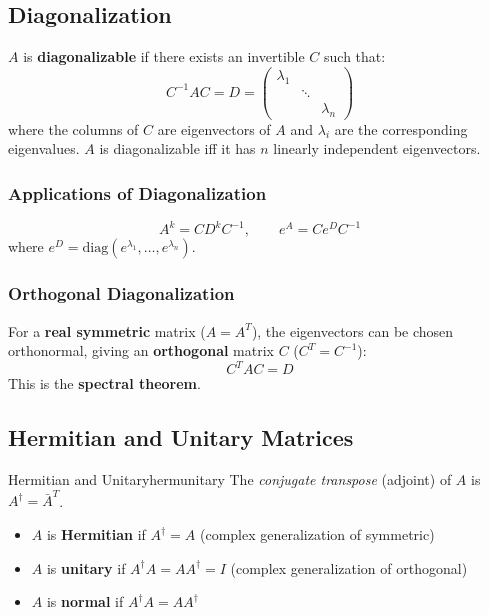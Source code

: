 \documentclass[11pt, letterpaper]{article}
\theoremstyle{plain}
\begin{document}
\subsection{Diagonalization}

$A$ is \textbf{diagonalizable} if there exists an invertible $C$ such that:
\[
    C^{-1}AC = D = \begin{pmatrix}\lambda_1 & & \\ & \ddots & \\ & & \lambda_n\end{pmatrix}
\]
where the columns of $C$ are eigenvectors of $A$ and $\lambda_i$ are the
corresponding eigenvalues. $A$ is diagonalizable iff it has $n$ linearly
independent eigenvectors.

\subsubsection*{Applications of Diagonalization}
\[
    A^k = CD^kC^{-1}, \qquad
    e^A = Ce^DC^{-1}
\]
where $e^D = \text{diag}(e^{\lambda_1},\ldots,e^{\lambda_n})$.

\subsubsection*{Orthogonal Diagonalization}
For a \textbf{real symmetric} matrix ($A = A^T$), the eigenvectors can be
chosen orthonormal, giving an \textbf{orthogonal} matrix $C$ ($C^T = C^{-1}$):
\[
    C^TAC = D
\]
This is the \textbf{spectral theorem}.


\subsection{Hermitian and Unitary Matrices}

\begin{definition}{Hermitian and Unitary}{hermunitary}
    The \emph{conjugate transpose} (adjoint) of $A$ is $A^\dagger = \bar{A}^T$.
    \begin{itemize}
        \item $A$ is \textbf{Hermitian} if $A^\dagger = A$
              (complex generalization of symmetric)
        \item $A$ is \textbf{unitary} if $A^\dagger A = AA^\dagger = I$
              (complex generalization of orthogonal)
        \item $A$ is \textbf{normal} if $A^\dagger A = AA^\dagger$
    \end{itemize}
\end{definition}
\end{document}
